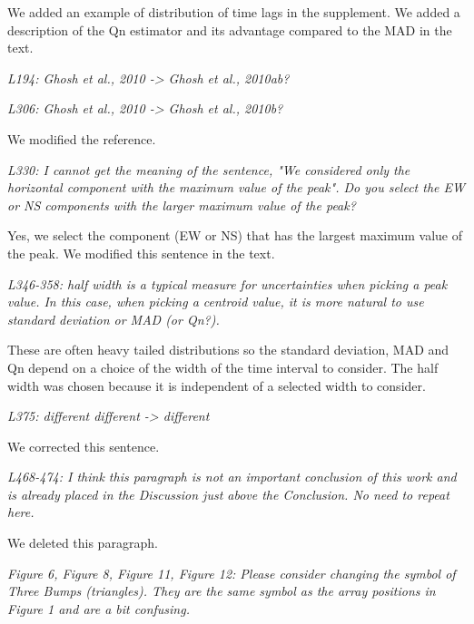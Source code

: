 \documentclass[letterpaper, 12pt]{article}
\begin{document}
\bigskip

We added an example of distribution of time lags in the supplement. We added a description of the Qn estimator and its advantage compared to the MAD in the text.

\bigskip

\textit{L194: Ghosh et al., 2010 -> Ghosh et al., 2010ab?}

\textit{L306: Ghosh et al., 2010 -> Ghosh et al., 2010b?}

\bigskip

We modified the reference.

\bigskip

\textit{L330: I cannot get the meaning of the sentence, "We considered only the horizontal component with the maximum value of the peak". Do you select the EW or NS components with the larger maximum value of the peak?}

\bigskip

Yes, we select the component (EW or NS) that has the largest maximum value of the peak. We modified this sentence in the text.

\bigskip

\textit{L346-358: half width is a typical measure for uncertainties when picking a peak value. In this case, when picking a centroid value, it is more natural to use standard deviation or MAD (or Qn?).}

\bigskip

These are often heavy tailed distributions so the standard deviation, MAD and Qn depend on a choice of the width of the time interval to consider. The half width was chosen because it is independent of a selected width to consider. 

\bigskip

\textit{L375: different different -> different}

\bigskip

We corrected this sentence.

\bigskip

\textit{L468-474: I think this paragraph is not an important conclusion of this work and is already placed in the Discussion just above the Conclusion. No need to repeat here.}

\bigskip

We deleted this paragraph.

\bigskip

\textit{Figure 6, Figure 8, Figure 11, Figure 12: Please consider changing the symbol of Three Bumps (triangles). They are the same symbol as the array positions in Figure 1 and are a bit confusing.}
\end{document}

